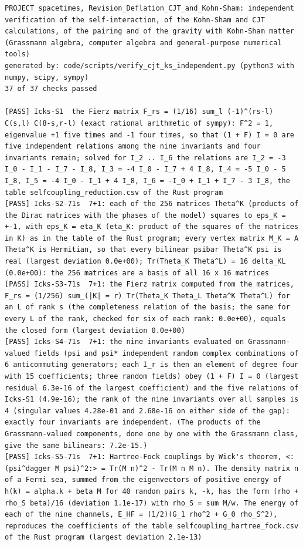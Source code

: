 \documentclass[
  10pt,
]{article}
\begin{document}
\begin{verbatim}
PROJECT spacetimes, Revision_Deflation_CJT_and_Kohn-Sham: independent verification of the self-interaction, of the Kohn-Sham and CJT calculations, of the pairing and of the gravity with Kohn-Sham matter (Grassmann algebra, computer algebra and general-purpose numerical tools)
generated by: code/scripts/verify_cjt_ks_independent.py (python3 with numpy, scipy, sympy)
37 of 37 checks passed

[PASS] Icks-S1  the Fierz matrix F_rs = (1/16) sum_l (-1)^(rs-l) C(s,l) C(8-s,r-l) (exact rational arithmetic of sympy): F^2 = 1, eigenvalue +1 five times and -1 four times, so that (1 + F) I = 0 are five independent relations among the nine invariants and four invariants remain; solved for I_2 .. I_6 the relations are I_2 = -3 I_0 - I_1 - I_7 - I_8, I_3 = -4 I_0 - I_7 + 4 I_8, I_4 = -5 I_0 - 5 I_8, I_5 = -4 I_0 - I_1 + 4 I_8, I_6 = -I_0 + I_1 + I_7 - 3 I_8, the table selfcoupling_reduction.csv of the Rust program
[PASS] Icks-S2-71s  7+1: each of the 256 matrices Theta^K (products of the Dirac matrices with the phases of the model) squares to eps_K = +-1, with eps_K = eta_K (eta_K: product of the squares of the matrices in K) as in the table of the Rust program; every vertex matrix M_K = A Theta^K is Hermitian, so that every bilinear psibar Theta^K psi is real (largest deviation 0.0e+00); Tr(Theta_K Theta^L) = 16 delta_KL (0.0e+00): the 256 matrices are a basis of all 16 x 16 matrices
[PASS] Icks-S3-71s  7+1: the Fierz matrix computed from the matrices, F_rs = (1/256) sum_(|K| = r) Tr(Theta_K Theta_L Theta^K Theta^L) for an L of rank s (the completeness relation of the basis; the same for every L of the rank, checked for six of each rank: 0.0e+00), equals the closed form (largest deviation 0.0e+00)
[PASS] Icks-S4-71s  7+1: the nine invariants evaluated on Grassmann-valued fields (psi and psi* independent random complex combinations of 6 anticommuting generators; each I_r is then an element of degree four with 15 coefficients; three random fields) obey (1 + F) I = 0 (largest residual 6.3e-16 of the largest coefficient) and the five relations of Icks-S1 (4.9e-16); the rank of the nine invariants over all samples is 4 (singular values 4.28e-01 and 2.68e-16 on either side of the gap): exactly four invariants are independent. (The products of the Grassmann-valued components, done one by one with the Grassmann class, give the same bilinears: 7.2e-15.)
[PASS] Icks-S5-71s  7+1: Hartree-Fock couplings by Wick's theorem, <:(psi^dagger M psi)^2:> = Tr(M n)^2 - Tr(M n M n). The density matrix n of a Fermi sea, summed from the eigenvectors of positive energy of h(k) = alpha.k + beta M for 40 random pairs k, -k, has the form (rho + rho_S beta)/16 (deviation 1.1e-17) with rho_S = sum M/w. The energy of each of the nine channels, E_HF = (1/2)(G_1 rho^2 + G_0 rho_S^2), reproduces the coefficients of the table selfcoupling_hartree_fock.csv of the Rust program (largest deviation 2.1e-13)

\end{verbatim}
\end{document}
